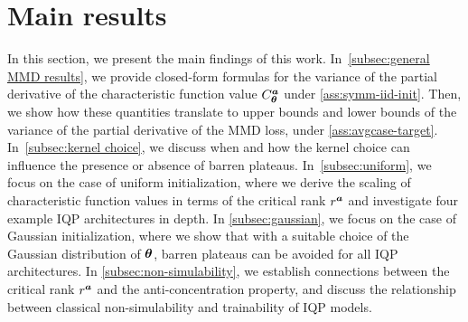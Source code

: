 \documentclass[10pt, twocolumn, a4paper]{article}
\theoremstyle{plain}
\theoremstyle{definition}
\theoremstyle{remark}
\begin{document}
\section{Main results} \label{sec:main-result}
In this section, we present the main findings of this work. In~\cref{subsec:general MMD results}, we provide closed-form formulas for the variance of the partial derivative of the characteristic function value $C_{{\bm{\theta}}}^{{\bm{a}}}$ under \cref{ass:symm-iid-init}. Then, we show how these quantities translate to upper bounds and lower bounds of the variance of the partial derivative of the MMD loss, under \cref{ass:avgcase-target}. In~\cref{subsec:kernel choice}, we discuss when and how the kernel choice can influence the presence or absence of barren plateaus. In~\cref{subsec:uniform}, we focus on the case of uniform initialization, where we derive the scaling of characteristic function values in terms of the critical rank $r^{\bm{a}}$ and investigate four example IQP architectures in depth. In \cref{subsec:gaussian}, we focus on the case of Gaussian initialization, where we show that with a suitable choice of the Gaussian distribution of ${\bm{\theta}}$, barren plateaus can be avoided for all IQP architectures. In \cref{subsec:non-simulability}, we establish connections between the critical rank $r^{\bm{a}}$ and the anti-concentration property, and discuss the relationship between classical non-simulability and trainability of IQP models. 
\end{document}
